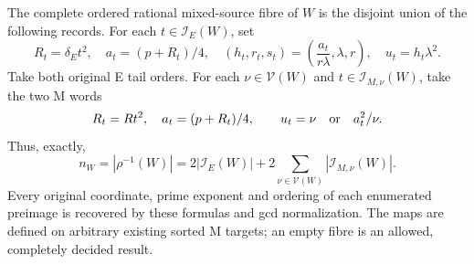 \begin{theorem}\label{thm:fibre}
The complete ordered rational mixed-source fibre of $W$ is the disjoint union
of the following records.
For each $t\in\mathcal I_E(W)$, set
\[
 R_t=\delta_Et^2,\quad a_t=(p+R_t)/4,\quad
 (h_t,r_t,s_t)=\left(\frac{a_t}{r\lambda},\lambda,r\right),
 \quad u_t=h_t\lambda^2.
\]
Take both original E tail orders. For each
$\nu\in\mathcal V(W)$ and $t\in\mathcal I_{M,\nu}(W)$, take the two M words
\[
 R_t=Rt^2,\quad a_t=(p+R_t)/4,\qquad
 u_t=\nu\quad\hbox{or}\quad a_t^2/\nu.
\]
Thus, exactly,
\begin{equation}\label{eq:fibrecount}
 n_W=|\rho^{-1}(W)|
 =2|\mathcal I_E(W)|+
 2\sum_{\nu\in\mathcal V(W)}|\mathcal I_{M,\nu}(W)|.
\end{equation}
 Every original coordinate, prime exponent and ordering of each enumerated
 preimage is recovered by these formulas and gcd normalization. The maps are
 defined on arbitrary existing
sorted M targets; an empty fibre is an allowed, completely decided result.
\end{theorem}
